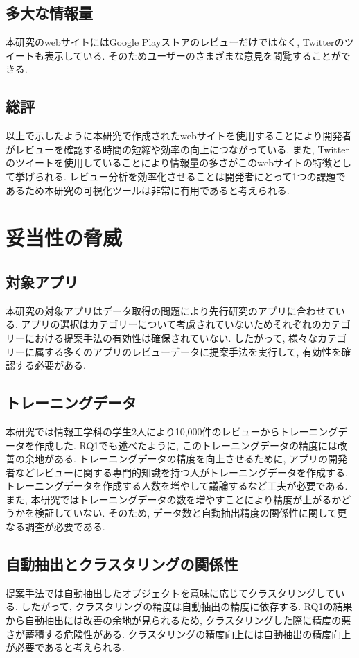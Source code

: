 \subsection{多大な情報量}
本研究のwebサイトにはGoogle Playストアのレビューだけではなく, Twitterのツイートも表示している. そのためユーザーのさまざまな意見を閲覧することができる. 

\subsection{総評}
以上で示したように本研究で作成されたwebサイトを使用することにより開発者がレビューを確認する時間の短縮や効率の向上につながっている. また, Twitterのツイートを使用していることにより情報量の多さがこのwebサイトの特徴として挙げられる. レビュー分析を効率化させることは開発者にとって1つの課題であるため本研究の可視化ツールは非常に有用であると考えられる. 

\section{妥当性の脅威}
\subsection{対象アプリ}
本研究の対象アプリはデータ取得の問題により先行研究のアプリに合わせている. アプリの選択はカテゴリーについて考慮されていないためそれぞれのカテゴリーにおける提案手法の有効性は確保されていない. 
したがって, 様々なカテゴリーに属する多くのアプリのレビューデータに提案手法を実行して, 有効性を確認する必要がある. 

\subsection{トレーニングデータ}
本研究では情報工学科の学生2人により10,000件のレビューからトレーニングデータを作成した. RQ1でも述べたように, このトレーニングデータの精度には改善の余地がある. 
トレーニングデータの精度を向上させるために, アプリの開発者などレビューに関する専門的知識を持つ人がトレーニングデータを作成する, トレーニングデータを作成する人数を増やして議論するなど工夫が必要である. 
また, 本研究ではトレーニングデータの数を増やすことにより精度が上がるかどうかを検証していない. そのため, データ数と自動抽出精度の関係性に関して更なる調査が必要である. 

\subsection{自動抽出とクラスタリングの関係性}
提案手法では自動抽出したオブジェクトを意味に応じてクラスタリングしている. したがって, クラスタリングの精度は自動抽出の精度に依存する. 
RQ1の結果から自動抽出には改善の余地が見られるため, クラスタリングした際に精度の悪さが蓄積する危険性がある. クラスタリングの精度向上には自動抽出の精度向上が必要であると考えられる. 